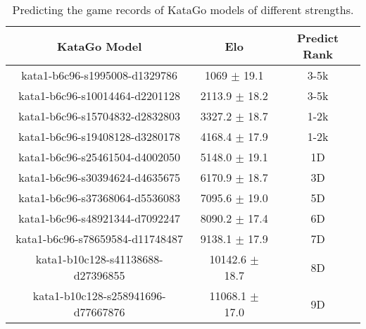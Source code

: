 \begin{table}[h]
\centering
\caption{Predicting the game records of KataGo models of different strengths.}
\begin{small}
\begin{tabular}{ccc}
\hline
KataGo Model & Elo &Predict Rank \\
\hline
kata1-b6c96-s1995008-d1329786 & 1069 \(\pm\) 19.1 & 3-5k \\
kata1-b6c96-s10014464-d2201128 & 2113.9 \(\pm\) 18.2 & 3-5k \\
kata1-b6c96-s15704832-d2832803 & 3327.2 \(\pm\) 18.7 & 1-2k \\
kata1-b6c96-s19408128-d3280178 & 4168.4 \(\pm\) 17.9 & 1-2k \\
kata1-b6c96-s25461504-d4002050 & 5148.0 \(\pm\) 19.1 & 1D \\
kata1-b6c96-s30394624-d4635675 & 6170.9 \(\pm\) 18.7 & 3D \\
kata1-b6c96-s37368064-d5536083 & 7095.6 \(\pm\) 19.0 & 5D \\
kata1-b6c96-s48921344-d7092247 & 8090.2 \(\pm\) 17.4 & 6D \\
kata1-b6c96-s78659584-d11748487 & 9138.1 \(\pm\) 17.9 & 7D \\
kata1-b10c128-s41138688-d27396855 & 10142.6 \(\pm\) 18.7 & 8D \\
kata1-b10c128-s258941696-d77667876 & 11068.1 \(\pm\) 17.0 & 9D \\
\hline
\end{tabular}
\end{small}
\end{table}